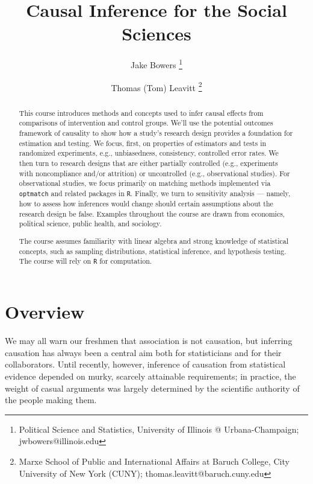 \documentclass[12pt]{article}
\title{Causal Inference for the Social Sciences}
\author{Jake Bowers \thanks{Political Science and Statistics, University of Illinois @ Urbana-Champaign; \mbox{jwbowers@illinois.edu}} \and
    Thomas (Tom) Leavitt \thanks{Marxe School of Public and International Affairs at Baruch College, City University of New York (CUNY); \mbox{thomas.leavitt@baruch.cuny.edu}}
}
\begin{document}
\maketitle
\begin{abstract}
\noindent This course introduces methods and concepts used to infer causal effects from comparisons of intervention and control groups. We'll use the potential outcomes framework of causality to show how a study's research design provides a foundation for estimation and testing. We focus, first, on properties of estimators and tests in randomized experiments, e.g., unbiasedness, consistency, controlled error rates. We then turn to research designs that are either partially controlled (e.g., experiments with noncompliance and/or attrition) or uncontrolled (e.g., observational studies). For observational studies, we focus primarily on matching methods implemented via \texttt{optmatch} and related packages in \texttt{R}. Finally, we turn to sensitivity analysis --- namely, how to assess how inferences would change should certain assumptions about the research design be false. Examples throughout the course are drawn from economics, political science, public health, and sociology.

The course assumes familiarity with linear algebra and strong knowledge of statistical concepts, such as sampling distributions, statistical inference, and hypothesis testing. The course will rely on \texttt{R} for computation.

\end{abstract}




\clearpage

\nobibliography*


\section*{Overview}

We may all warn our freshmen that association is not causation, but inferring causation has always been a central aim both for statisticians and for their collaborators. Until recently, however, inference of causation from statistical evidence depended on murky, scarcely attainable requirements; in practice, the weight of casual arguments was largely determined by the scientific authority of the people making them.
\end{document}

